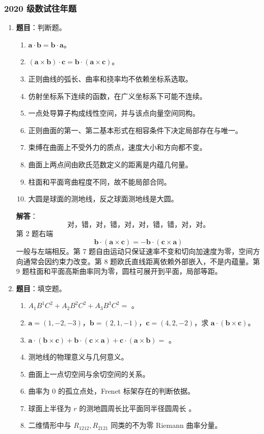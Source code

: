 \documentclass[UTF8,12pt,a4paper]{ctexart}
\newcommand{\vct}[1]{\boldsymbol{#1}}
\begin{document}
\subsubsection{2020 级数试往年题}
\begin{enumerate}
\item \textbf{题目}：判断题。
\begin{enumerate}
\item $\vct a\cdot\vct b=\vct b\cdot\vct a$。
\item $(\vct a\times\vct b)\cdot\vct c=\vct b\cdot(\vct a\times\vct c)$。
\item 正则曲线的弧长、曲率和挠率均不依赖坐标系选取。
\item 仿射坐标系下连续的函数，在广义坐标系下可能不连续。
\item 一点处导算子构成线性空间，并与该点向量空间同构。
\item 正则曲面的第一、第二基本形式在相容条件下决定局部存在与唯一。
\item 束缚在曲面上不受外力的质点，速度大小和方向都不变。
\item 曲面上两点间由欧氏范数定义的距离是内蕴几何量。
\item 柱面和平面弯曲程度不同，故不能局部合同。
\item 大圆是球面的测地线，反之球面测地线是大圆。
\end{enumerate}

\textbf{解答}：
\[
\boxed{\text{对，错，对，错，对，对，错，错，对，对。}}
\]
第 2 题右端
\[
\vct b\cdot(\vct a\times\vct c)=-\vct b\cdot(\vct c\times\vct a)
\]
一般与左端相反。第 7 题自由运动只保证速率不变和切向加速度为零，空间方向通常会因约束力改变。第 8 题欧氏直线距离依赖外部嵌入，不是内蕴量。第 9 题柱面和平面高斯曲率同为零，圆柱可展开到平面，局部等距。

\item \textbf{题目}：填空题。
\begin{enumerate}
\item $A_1B^1C^2+A_2B^2C^2+A_3B^3C^2=$ \underline{\hspace{2cm}}。
\item $\vct a=(1,-2,-3)$，$\vct b=(2,1,-1)$，$\vct c=(4,2,-2)$，求 $\vct a\cdot(\vct b\times\vct c)$。
\item $\vct a\cdot(\vct b\times\vct c)+\vct b\cdot(\vct c\times\vct a)+\vct c\cdot(\vct a\times\vct b)=$ \underline{\hspace{2cm}}。
\item 测地线的物理意义与几何意义。
\item 曲面上一点切空间与余切空间的关系。
\item 曲率为 $0$ 的孤立点处，Frenet 标架存在的判断依据。
\item 球面上半径为 $r$ 的测地圆周长比平面同半径圆周长 \underline{\hspace{2cm}}。
\item 二维情形中与 $R_{1212},R_{2121}$ 同类的不为零 Riemann 曲率分量。
\end{enumerate}


\end{enumerate}
\end{document}

